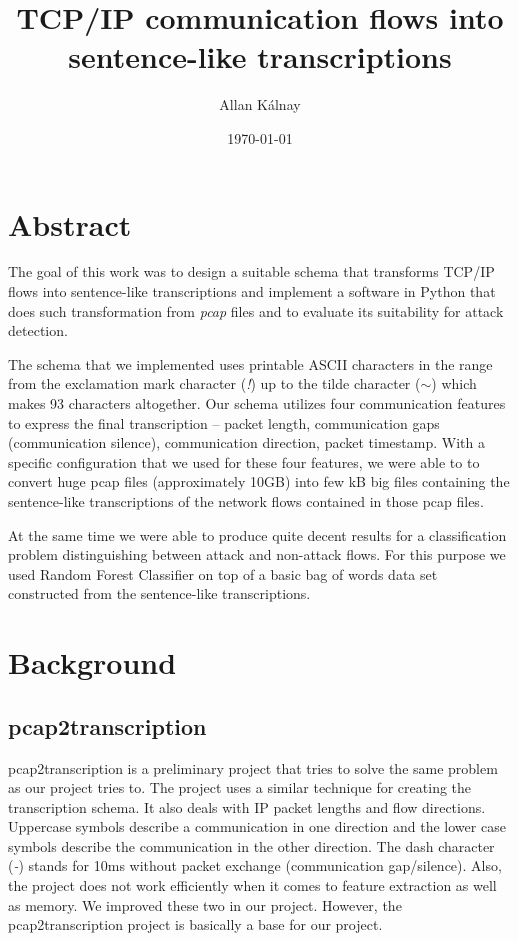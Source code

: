 \documentclass{article}
\title{TCP/IP communication flows into sentence-like transcriptions}
\author{Allan Kálnay}
\date{\today}
\begin{document}
\sloppy

\maketitle

\section*{Abstract}
The goal of this work was to design a suitable schema that transforms TCP/IP flows into sentence-like transcriptions and implement a software in Python that does such transformation from \textit{pcap} files and to evaluate its suitability for attack detection.

The schema that we implemented uses printable ASCII characters in the range from the exclamation mark character (\textit{!}) up to the tilde character (\textit{$\sim$}) which makes 93 characters altogether. Our schema utilizes four communication features to express the final transcription -- packet length, communication gaps (communication silence), communication direction, packet timestamp. With a specific configuration that we used for these four features, we were able to to convert huge pcap files (approximately 10GB) into few kB big files containing the sentence-like transcriptions of the network flows contained in those pcap files.

At the same time we were able to produce quite decent results for a classification problem distinguishing between attack and non-attack flows. For this purpose we used Random Forest Classifier on top of a basic bag of words data set constructed from the sentence-like transcriptions.

\newpage
\tableofcontents
\newpage

\section{Background}
\subsection{pcap2transcription}
pcap2transcription \cite{pcap2transcription} is a preliminary project that tries to solve the same problem as our project tries to. The project uses a similar technique for creating the transcription schema. It also deals with IP packet lengths and flow directions. Uppercase symbols describe a communication in one direction and the lower case symbols describe the communication in the other direction. The dash character (\textit{-}) stands for 10ms without packet exchange (communication gap/silence). Also, the project does not work efficiently when it comes to feature extraction as well as memory. We improved these two in our project. However, the pcap2transcription project is basically a base for our project.
\end{document}
